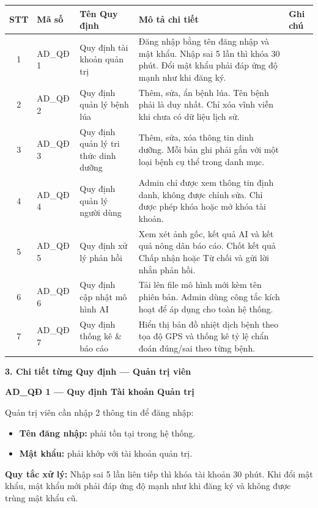\documentclass[12pt,a4paper]{article}
\begin{document}
\begin{longtable}{|c|p{1.8cm}|p{3.5cm}|p{6.5cm}|p{1cm}|}
\hline
\rowcolor{headerblue}
\textbf{STT} & \textbf{Mã số} & \textbf{Tên Quy định} & \textbf{Mô tả chi tiết} & \textbf{Ghi chú} \\
\hline
\endhead
1 & AD\_QĐ 1 & Quy định tài khoản quản trị & Đăng nhập bằng tên đăng nhập và mật khẩu. Nhập sai 5 lần thì khóa 30 phút. Đổi mật khẩu phải đáp ứng độ mạnh như khi đăng ký. & \\
\hline
2 & AD\_QĐ 2 & Quy định quản lý bệnh lúa & Thêm, sửa, ẩn bệnh lúa. Tên bệnh phải là duy nhất. Chỉ xóa vĩnh viễn khi chưa có dữ liệu lịch sử. & \\
\hline
3 & AD\_QĐ 3 & Quy định quản lý tri thức dinh dưỡng & Thêm, sửa, xóa thông tin dinh dưỡng. Mỗi bản ghi phải gắn với một loại bệnh cụ thể trong danh mục. & \\
\hline
4 & AD\_QĐ 4 & Quy định quản lý người dùng & Admin chỉ được xem thông tin định danh, không được chỉnh sửa. Chỉ được phép khóa hoặc mở khóa tài khoản. & \\
\hline
5 & AD\_QĐ 5 & Quy định xử lý phản hồi & Xem xét ảnh gốc, kết quả AI và kết quả nông dân báo cáo. Chốt kết quả Chấp nhận hoặc Từ chối và gửi lời nhắn phản hồi. & \\
\hline
6 & AD\_QĐ 6 & Quy định cập nhật mô hình AI & Tải lên file mô hình mới kèm tên phiên bản. Admin dùng công tắc kích hoạt để áp dụng cho toàn hệ thống. & \\
\hline
7 & AD\_QĐ 7 & Quy định thống kê \& báo cáo & Hiển thị bản đồ nhiệt dịch bệnh theo tọa độ GPS và thống kê tỷ lệ chẩn đoán đúng/sai theo từng bệnh. & \\
\hline
\end{longtable}

\vspace{0.3cm}
\textbf{3. Chi tiết từng Quy định --- Quản trị viên}

\vspace{0.3cm}
\noindent\textbf{AD\_QĐ 1 --- Quy định Tài khoản Quản trị}

Quản trị viên cần nhập 2 thông tin để đăng nhập:
\begin{itemize}
    \item \textbf{Tên đăng nhập:} phải tồn tại trong hệ thống.
    \item \textbf{Mật khẩu:} phải khớp với tài khoản quản trị.
\end{itemize}
\textbf{Quy tắc xử lý:} Nhập sai 5 lần liên tiếp thì khóa tài khoản 30 phút. Khi đổi mật khẩu, mật khẩu mới phải đáp ứng độ mạnh như khi đăng ký và không được trùng mật khẩu cũ.
\end{document}
